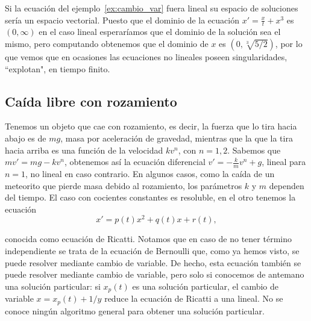 \documentclass[../main.tex]{subfiles}
\begin{document}
\begin{remark}
    Si la ecuación del ejemplo~\ref{ex:cambio_var} fuera lineal su espacio de
    soluciones sería un espacio vectorial. Puesto que el dominio de la ecuación
    \(x' = \frac{x}{t} + x^3\) es \((0, \infty)\) en el caso lineal esperaríamos
    que el dominio de la solución sea el mismo, pero computando obtenemos que el
    dominio de \(x\) es \((0, \sqrt[3]{5/2})\), por lo que vemos que en ocasiones
    las ecuaciones no lineales poseen singularidades, ``explotan", en tiempo
    finito.
\end{remark}

\subsection{Caída libre con rozamiento}
Tenemos un objeto que cae con rozamiento, es decir, la fuerza que lo tira
hacia abajo es de \(mg\), masa por aceleración de gravedad, mientras que la
que la tira hacia arriba es una función de la velocidad \(kv^n\), con 
\(n = 1,2\). Sabemos que \(mv' = mg - kv^n\), obtenemos así la ecuación
diferencial \(v' = -\frac{k}{m} v^n + g\), lineal para \(n = 1\), no lineal
en caso contrario. En algunos casos, como la caída de un meteorito que
pierde masa debido al rozamiento, los parámetros \(k\) y \(m\) dependen del
tiempo. El caso con cocientes constantes es resoluble, en el otro tenemos la
ecuación
\[x' = p(t)x^2 + q(t)x + r(t),\]

conocida como ecuación de Ricatti. Notamos que en caso de no tener término
independiente se trata de la ecuación de Bernoulli que, como ya hemos visto, se
puede resolver mediante cambio de variable. De hecho, esta ecuación también se
puede resolver mediante cambio de variable, pero solo si conocemos de antemano
una solución particular: si \(x_p(t)\) es una solución particular, el cambio de
variable \(x = x_p(t) + 1/y\) reduce la ecuación de Ricatti a una lineal. No
se conoce ningún algoritmo general para obtener una solución particular.
\end{document}
